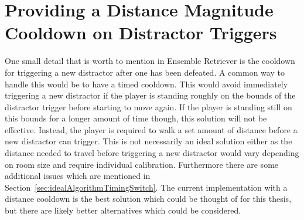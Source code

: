 \section{Providing a Distance Magnitude Cooldown on Distractor Triggers}
One small detail that is worth to mention in Ensemble Retriever is the cooldown for triggering a new distractor after one has been defeated. A common way to handle this would be to have a timed cooldown. This would avoid immediately triggering a new distractor if the player is standing roughly on the bounds of the distractor trigger before starting to move again. If the player is standing still on this bounds for a longer amount of time though, this solution will not be effective. Instead, the player is required to walk a set amount of distance before a new distractor can trigger. This is not necessarily an ideal solution either as the distance needed to travel before triggering a new distractor would vary depending on room size and require individual calibration. Furthermore there are some additional issues which are mentioned in Section~\ref{sec:idealAlgorithmTimingSwitch}. The current implementation with a distance cooldown is the best solution which could be thought of for this thesis, but there are likely better alternatives which could be considered. 